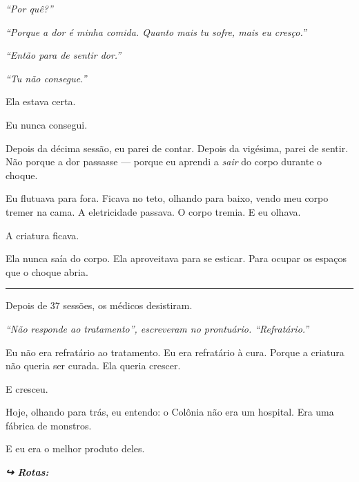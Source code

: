 \noindent \textit{\textquotedblleft{}Por quê?\textquotedblright{}}

\noindent \textit{\textquotedblleft{}Porque a dor é minha comida. Quanto mais tu sofre, mais eu cresço.\textquotedblright{}}

\noindent \textit{\textquotedblleft{}Então para de sentir dor.\textquotedblright{}}

\noindent \textit{\textquotedblleft{}Tu não consegue.\textquotedblright{}}

\noindent Ela estava certa.

\noindent Eu nunca consegui.

\noindent Depois da décima sessão, eu parei de contar. Depois da vigésima, parei de sentir. Não porque a dor passasse --- porque eu aprendi a \textit{sair} do corpo durante o choque.

\noindent Eu flutuava para fora. Ficava no teto, olhando para baixo, vendo meu corpo tremer na cama. A eletricidade passava. O corpo tremia. E eu olhava.

\noindent A criatura ficava.

\noindent Ela nunca saía do corpo.
Ela aproveitava para se esticar.
Para ocupar os espaços que o choque abria.

\vspace{0.5em}\noindent\rule{\textwidth}{0.5pt}\vspace{0.5em}

\noindent Depois de 37 sessões, os médicos desistiram.

\noindent \textit{\textquotedblleft{}Não responde ao tratamento\textquotedblright{}\textit{, escreveram no prontuário. }\textquotedblleft{}Refratário.\textquotedblright{}}

\noindent Eu não era refratário ao tratamento.
Eu era refratário à cura.
Porque a criatura não queria ser curada.
Ela queria crescer.

\noindent E cresceu.

\noindent Hoje, olhando para trás, eu entendo: o Colônia não era um hospital.
Era uma fábrica de monstros.

\noindent E eu era o melhor produto deles.

\vspace{0.5em}
\noindent\textit{\textbf{↪ Rotas:}  \rotasep {} \rotasep {}}